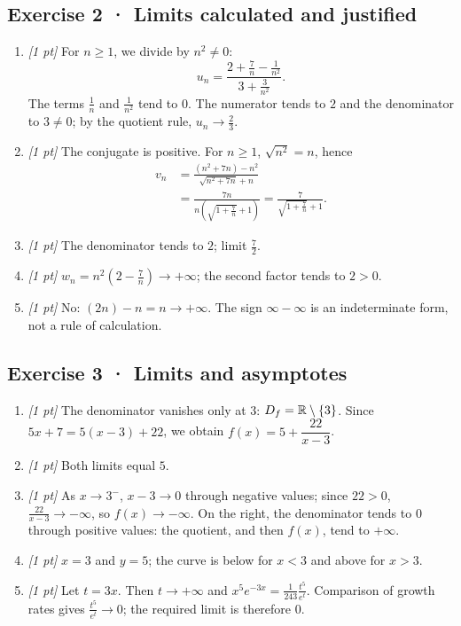 \subsection*{Exercise 2 · Limits calculated and justified}\begin{enumerate}

\item \textit{[1 pt]} For $n\ge1$, we divide by $n^2\ne0$:
\[u_n=\frac{2+\frac{7}{n}-\frac{1}{n^2}}{3+\frac{3}{n^2}}.\]
The terms $\frac{1}{n}$ and $\frac{1}{n^2}$ tend to $0$. The numerator tends to $2$ and the denominator to $3\ne0$; by the quotient rule, $u_n\to\frac{2}{3}$.

\item \textit{[1 pt]} The conjugate is positive. For $n\ge1$, $\sqrt{n^2}=n$, hence
\[\begin{aligned}v_n&=\frac{(n^2+7n)-n^2}{\sqrt{n^2+7n}+n}\\&=\frac{7n}{n(\sqrt{1+\frac{7}{n}}+1)}=\frac{7}{\sqrt{1+\frac{7}{n}}+1}.\end{aligned}\]

\item \textit{[1 pt]} The denominator tends to $2$; limit $\frac{7}{2}$.

\item \textit{[1 pt]} $w_n=n^2(2-\frac{7}{n})\to+\infty$; the second factor tends to $2>0$.

\item \textit{[1 pt]} No: $(2n)-n=n\to+\infty$. The sign $\infty-\infty$ is an indeterminate form, not a rule of calculation.

\end{enumerate}

\subsection*{Exercise 3 · Limits and asymptotes}\begin{enumerate}

\item \textit{[1 pt]} The denominator vanishes only at $3$: $D_f=\mathbb R\setminus\{3\}$. Since $5x+7=5(x-3)+22$, we obtain $f(x)=5+\dfrac{22}{x-3}$.

\item \textit{[1 pt]} Both limits equal $5$.

\item \textit{[1 pt]} As $x\to 3^-$, $x-3\to0$ through negative values; since $22>0$, $\frac{22}{x-3}\to-\infty$, so $f(x)\to-\infty$. On the right, the denominator tends to $0$ through positive values: the quotient, and then $f(x)$, tend to $+\infty$.

\item \textit{[1 pt]} $x=3$ and $y=5$; the curve is below for $x<3$ and above for $x>3$.

\item \textit{[1 pt]} Let $t=3x$. Then $t\to+\infty$ and $x^5e^{-3x}=\frac{1}{243}\frac{t^5}{e^t}$. Comparison of growth rates gives $\frac{t^5}{e^t}\to0$; the required limit is therefore $0$.

\end{enumerate}

